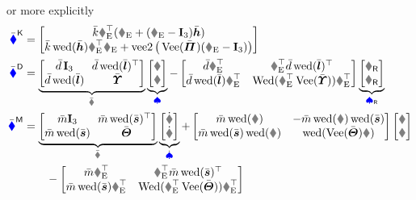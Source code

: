 or more explicitly
\begin{subequations}
\begin{align}
 \genForceStiffC
 &= \begin{bmatrix} \kc \RE^\top (\rE + (\RE-\idMat[3])\hc) \\ \kc \wedOp(\hc) \RE^\top \rE + \veeTwoOp\big( \veeMatOp(\kapc) (\RE-\idMat[3]) \big) \end{bmatrix}
\\
 \genForceDissC 
 &= \underbrace{\begin{bmatrix} \dc \,\idMat[3] & \!\!\dc \wedOp(\lc)^\top \\ \dc \wedOp(\lc) & \sigc \end{bmatrix}}_{\bodyDissMatC{}{}} \underbrace{\begin{bmatrix} \v \\ \w \end{bmatrix}}_{\sysVel}
 - \begin{bmatrix} \dc\RE^\top & \RE^\top \dc \wedOp(\lc)^\top \\ \dc\wedOp(\lc) \RE^\top & \wedMatOp(\RE^\top \veeMatOp(\sigc)) \RE^\top \end{bmatrix}
 \underbrace{\begin{bmatrix} \vR \\ \wR \end{bmatrix}}_{\sysVelR}
\\
 \genForceInertiaC 
 &= \underbrace{\begin{bmatrix} \mc \idMat[3] & \!\!\mc \wedOp(\sc)^\top \\ \mc \wedOp(\sc) & \Jc \end{bmatrix}}_{\bodyInertiaMatC{}{}} \underbrace{\begin{bmatrix} \vd \\ \wdot \end{bmatrix}}_{\sysVeld}
 + \begin{bmatrix} \mc \wedOp(\w) & -\mc \wedOp(\w) \wedOp(\sc) \\ \mc \wedOp(\sc) \wedOp(\w) & \wedOp(\veeMatOp(\Jc)\w) \end{bmatrix} \begin{bmatrix} \v \\ \w \end{bmatrix}
\nonumber\\
 &\qquad
 - \begin{bmatrix} \mc\RE^\top & \RE^\top \mc \wedOp(\sc)^\top \\ \mc\wedOp(\sc) \RE^\top & \wedMatOp(\RE^\top \veeMatOp(\Jc)) \RE^\top \end{bmatrix}

\end{align}
\end{subequations}
